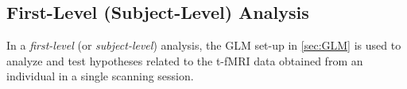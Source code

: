 %

\subsection{First-Level (Subject-Level) Analysis}
\label{sec:first_level}

In a \textit{first-level} (or \textit{subject-level}) analysis, the GLM set-up in \ref{sec:GLM} is used to analyze and test hypotheses related to the t-fMRI data obtained from an individual in a single scanning session. 

